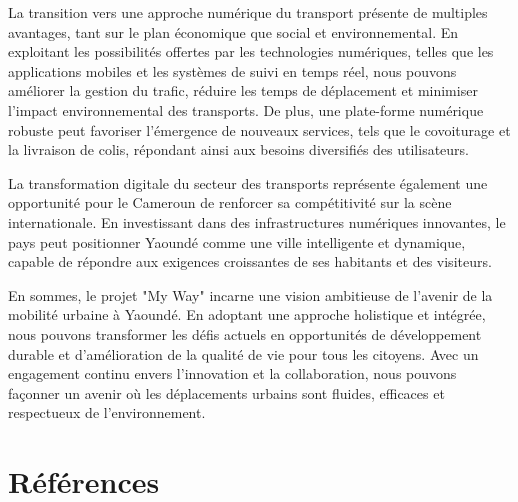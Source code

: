 \documentclass{article}
\begin{document}
La transition vers une approche numérique du transport présente de multiples avantages, tant sur le plan économique que social et environnemental. En exploitant les possibilités offertes par les technologies numériques, telles que les applications mobiles et les systèmes de suivi en temps réel, nous pouvons améliorer la gestion du trafic, réduire les temps de déplacement et minimiser l'impact environnemental des transports. De plus, une plate-forme numérique robuste peut favoriser l'émergence de nouveaux services, tels que le covoiturage et la livraison de colis, répondant ainsi aux besoins diversifiés des utilisateurs.

La transformation digitale du secteur des transports représente également une opportunité pour le Cameroun de renforcer sa compétitivité sur la scène internationale. En investissant dans des infrastructures numériques innovantes, le pays peut positionner Yaoundé comme une ville intelligente et dynamique, capable de répondre aux exigences croissantes de ses habitants et des visiteurs.

En sommes, le projet "My Way" incarne une vision ambitieuse de l'avenir de la mobilité urbaine à Yaoundé. En adoptant une approche holistique et intégrée, nous pouvons transformer les défis actuels en opportunités de développement durable et d'amélioration de la qualité de vie pour tous les citoyens. Avec un engagement continu envers l'innovation et la collaboration, nous pouvons façonner un avenir où les déplacements urbains sont fluides, efficaces et respectueux de l'environnement.
\newpage

\section*{Références}
\end{document}
